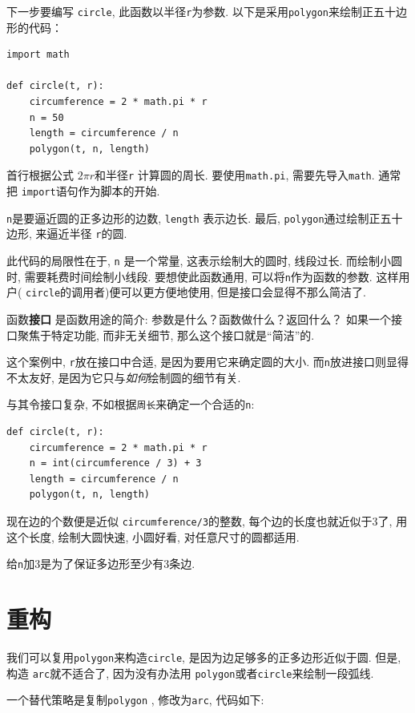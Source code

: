 \documentclass[10pt]{book}
\begin{document}
下一步要编写 {\tt circle}, 此函数以半径{\tt r}为参数. 
以下是采用{\tt polygon}来绘制正五十边形的代码：

\begin{verbatim}
import math

def circle(t, r):
    circumference = 2 * math.pi * r
    n = 50
    length = circumference / n
    polygon(t, n, length)
\end{verbatim}
%
首行根据公式 $2 \pi r$和半径{\tt r} 计算圆的周长. 
要使用{\tt math.pi},  需要先导入{\tt math}. 
通常把 {\tt import}语句作为脚本的开始. 

{\tt n}是要逼近圆的正多边形的边数, {\tt length} 表示边长. 
最后,  {\tt polygon}通过绘制正五十边形, 来逼近半径 {\tt r}的圆. 

此代码的局限性在于, {\tt n} 是一个常量, 这表示绘制大的圆时, 线段过长. 
而绘制小圆时, 需要耗费时间绘制小线段. 
要想使此函数通用, 可以将{\tt n}作为函数的参数. 
这样用户( {\tt circle}的调用者)便可以更方便地使用, 但是接口会显得不那么简洁了. 

函数{\bf 接口} 是函数用途的简介: 参数是什么？函数做什么？返回什么？
如果一个接口聚焦于特定功能, 而非无关细节, 那么这个接口就是``简洁''的. 

这个案例中, {\tt r}放在接口中合适, 是因为要用它来确定圆的大小. 
而{\tt n}放进接口则显得不太友好, 是因为它只与{\em 如何}绘制圆的细节有关. 

与其令接口复杂, 不如根据{\tt 周长}来确定一个合适的{\tt n}:

\begin{verbatim}
def circle(t, r):
    circumference = 2 * math.pi * r
    n = int(circumference / 3) + 3
    length = circumference / n
    polygon(t, n, length)
\end{verbatim}
%
现在边的个数便是近似 {\tt circumference/3}的整数, 
每个边的长度也就近似于3了, 用这个长度, 绘制大圆快速, 小圆好看, 
对任意尺寸的圆都适用. 

给{\tt n}加3是为了保证多边形至少有3条边. 

\section{重构}
\label{refactoring}

我们可以复用{\tt polygon}来构造{\tt circle}, 是因为边足够多的正多边形近似于圆. 
但是, 构造 {\tt arc}就不适合了, 因为没有办法用 {\tt polygon}或者{\tt circle}来绘制一段弧线. 

一个替代策略是复制{\tt polygon} ,  修改为{\tt arc}, 代码如下:
\end{document}
